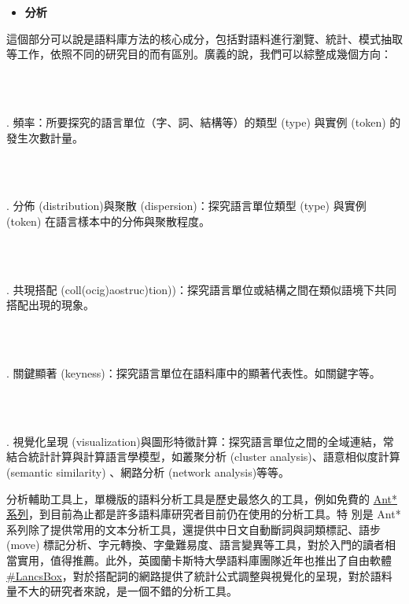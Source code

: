 \begin{itemize}
\item \textbf{分析}

\end{itemize}

這個部分可以說是語料庫方法的核心成分，包括對語料進行瀏覽、統計、模式抽取等工作，依照不同的研究目的而有區別。廣義的說，我們可以綜整成幾個方向：

\ea%
    \label{ex:key:1}
    \gll\\
        \\
    \glt
    \z

        . 頻率：所要探究的語言單位（字、詞、結構等）的類型 (type) 與實例 (token) 的發生次數計量。

\ea%
    \label{ex:key:2}
    \gll\\
        \\
    \glt
    \z

        . 分佈 (distribution)與聚散 (dispersion)：探究語言單位類型 (type) 與實例 (token) 在語言樣本中的分佈與聚散程度。

\ea%
    \label{ex:key:3}
    \gll\\
        \\
    \glt
    \z

        . 共現搭配 (coll(oc{\textbar}ig)a{\textbar}ostruc)tion))：探究語言單位或結構之間在類似語境下共同搭配出現的現象。

\ea%
    \label{ex:key:4}
    \gll\\
        \\
    \glt
    \z

        . 關鍵顯著 (keyness)：探究語言單位在語料庫中的顯著代表性。如關鍵字等。

\ea%
    \label{ex:key:5}
    \gll\\
        \\
    \glt
    \z

        . 視覺化呈現 (visualization)與圖形特徵計算：探究語言單位之間的全域連結，常結合統計計算與計算語言學模型，如叢聚分析 (cluster analysis)、語意相似度計算 (semantic similarity) 、網路分析 (network analysis)等等。

分析輔助工具上，單機版的語料分析工具是歷史最悠久的工具，例如免費的 \href{http://www.laurenceanthony.net/%20software.html}{Ant*}\href{http://www.laurenceanthony.net/%20software.html}{系列}，到目前為止都是許多語料庫研究者目前仍在使用的分析工具。特 別是 Ant* 系列除了提供常用的文本分析工具，還提供中日文自動斷詞與詞類標記、語步 (move) 標記分析、字元轉換、字彙難易度、語言變異等工具，對於入門的讀者相當實用，值得推薦。此外，英國蘭卡斯特大學語料庫團隊近年也推出了自由軟體 \href{http://corpora.lancs.ac.uk/lancsbox/}{\#LancsBox}，對於搭配詞的網路提供了統計公式調整與視覺化的呈現，對於語料量不大的研究者來說，是一個不錯的分析工具。

